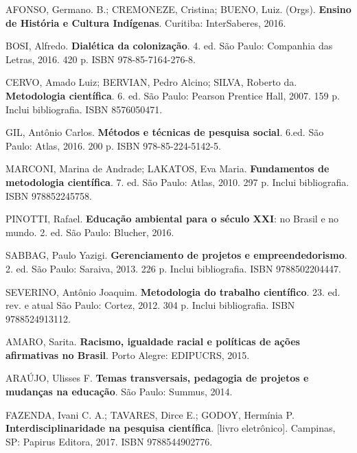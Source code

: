 \begin{pud}
	\begin{bibbasica}
			
        \item AFONSO, Germano. B.; CREMONEZE, Cristina; BUENO, Luiz. (Orgs). \textbf{Ensino de História e Cultura Indígenas}. Curitiba: InterSaberes, 2016. 
		\item BOSI, Alfredo. \textbf{Dialética da colonização}. 4. ed. São Paulo: Companhia das Letras, 2016. 420 p. ISBN 978-85-7164-276-8. %
		\item CERVO, Amado Luiz; BERVIAN, Pedro Alcino; SILVA, Roberto da. \textbf{Metodologia científica}. 6. ed. São Paulo: Pearson Prentice Hall, 2007. 159 p. Inclui bibliografia. ISBN 8576050471.    %
		\item GIL, Antônio Carlos. \textbf{Métodos e técnicas de pesquisa social}. 6.ed.  São Paulo: Atlas, 2016. 200 p. ISBN 978-85-224-5142-5. %
		\item MARCONI, Marina de Andrade; LAKATOS, Eva Maria. \textbf{Fundamentos de metodologia científica}. 7. ed. São Paulo: Atlas, 2010. 297 p. Inclui bibliografia. ISBN 978852245758. %
		\item PINOTTI, Rafael. \textbf{Educação ambiental para o século XXI}: no Brasil e no mundo. 2. ed. São Paulo: Blucher, 2016. 
		\item SABBAG, Paulo Yazigi. {\bfseries Gerenciamento de projetos e empreendedorismo}. 2. ed. São Paulo: Saraiva, 2013. 226 p. Inclui bibliografia. ISBN 9788502204447. %
		\item SEVERINO, Antônio Joaquim. {\bfseries Metodologia do trabalho científico}. 23. ed. rev. e atual São Paulo: Cortez, 2012. 304 p. Inclui bibliografia. ISBN 9788524913112. %
	 
	\end{bibbasica}
	
	\begin{bibcomplementar}
        	\item AMARO, Sarita. \textbf{Racismo, igualdade racial e políticas de ações afirmativas no Brasil}.  Porto Alegre: EDIPUCRS, 2015.
		
 			\item ARAÚJO, Ulisses F.  {\bfseries Temas transversais, pedagogia de projetos e mudanças na educação}.  São Paulo: Summus, 2014. 
 			\item FAZENDA, Ivani C. A.; TAVARES, Dirce E.; GODOY, Hermínia P. \textbf{Interdisciplinaridade na pesquisa científica}. [livro eletrônico].  Campinas, SP: Papirus Editora, 2017.  ISBN 9788544902776.  
		

\end{bibcomplementar}
\end{pud}
